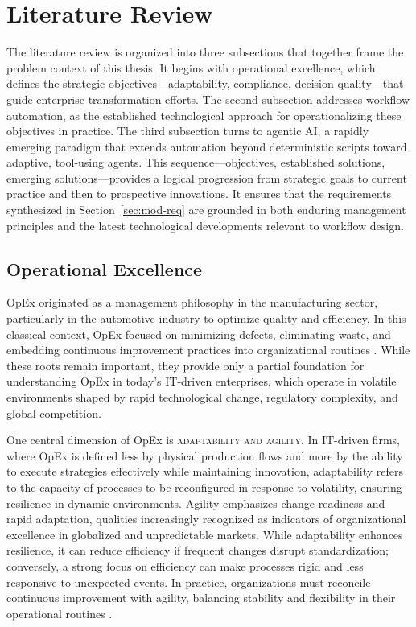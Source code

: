 \section{Literature Review}\label{sec:lit-rev}
The literature review is organized into three subsections that together frame the problem context of this thesis. It begins with operational excellence, which defines the strategic objectives—adaptability, compliance, decision quality—that guide enterprise transformation efforts. The second subsection addresses workflow automation, as the established technological approach for operationalizing these objectives in practice. The third subsection turns to agentic AI, a rapidly emerging paradigm that extends automation beyond deterministic scripts toward adaptive, tool-using agents. This sequence—objectives, established solutions, emerging solutions—provides a logical progression from strategic goals to current practice and then to prospective innovations. It ensures that the requirements synthesized in Section~\ref{sec:mod-req} are grounded in both enduring management principles and the latest technological developments relevant to workflow design.

\subsection{Operational Excellence}\label{subsec:op-ex}
OpEx originated as a management philosophy in the manufacturing sector, particularly in the automotive industry to optimize quality and efficiency. In this classical context, OpEx focused on minimizing defects, eliminating waste, and embedding continuous improvement practices into organizational routines \parencite{juranQuality1999, womackLean2013}. While these roots remain important, they provide only a partial foundation for understanding OpEx in today's IT-driven enterprises, which operate in volatile environments shaped by rapid technological change, regulatory complexity, and global competition.

One central dimension of OpEx is \textsc{adaptability and agility}. In IT-driven firms, where OpEx is defined less by physical production flows and more by the ability to execute strategies effectively while maintaining innovation, adaptability refers to the capacity of processes to be reconfigured in response to volatility, ensuring resilience in dynamic environments. Agility emphasizes change-readiness and rapid adaptation, qualities increasingly recognized as indicators of organizational excellence in globalized and unpredictable markets. While adaptability enhances resilience, it can reduce efficiency if frequent changes disrupt standardization; conversely, a strong focus on efficiency can make processes rigid and less responsive to unexpected events. In practice, organizations must reconcile continuous improvement with agility, balancing stability and flexibility in their operational routines \parencite{carvalhoOperational2023}.

